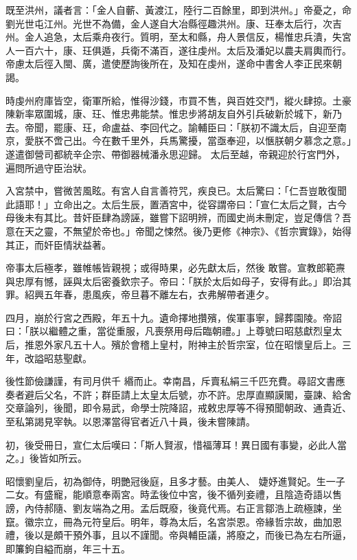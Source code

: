 \begin{pinyinscope}
 既至洪州，議者言：「金人自蘄、黃渡江，陸行二百餘里，即到洪州。」帝憂之，命劉光世屯江州。光世不為備，金人遂自大冶縣徑趣洪州。康、玨奉太后行，次吉州。金人追急，太后乘舟夜行。質明，至太和縣，舟人景信反，楊惟忠兵潰，失宮人一百六十，康、玨俱遁，兵衛不滿百，遂往虔州。太后及潘妃以農夫肩輿而行。
 帝慮太后徑入閩、廣，遣使歷詢後所在，及知在虔州，遂命中書舍人李正民來朝謁。



 時虔州府庫皆空，衛軍所給，惟得沙錢，市買不售，與百姓交鬥，縱火肆掠。土豪陳新率眾圍城，康、玨、惟忠弗能禁。惟忠步將胡友自外引兵破新於城下，新乃去。帝聞，罷康、玨，命盧益、李回代之。諭輔臣曰：「朕初不識太后，自迎至南京，愛朕不啻己出。今在數千里外，兵馬驚擾，當亟奉迎，以愜朕朝夕慕念之意。」遂遣御營司都統辛企宗、帶御器械潘永思迎歸。
 太后至越，帝親迎於行宮門外，遍問所過守臣治狀。



 入宮禁中，嘗微苦風眩。有宮人自言善符咒，疾良已。太后驚曰：「仁吾豈敢復聞此語耶！」立命出之。太后生辰，置酒宮中，從容謂帝曰：「宣仁太后之賢，古今母後未有其比。昔奸臣肆為謗誣，雖嘗下詔明辨，而國史尚未刪定，豈足傳信？吾意在天之靈，不無望於帝也。」帝聞之悚然。後乃更修《神宗》、《哲宗實錄》，始得其正，而奸臣情狀益著。



 帝事太后極孝，雖帷帳皆親視；或得時果，必先獻太后，然後
 敢嘗。宣教郎範燾與忠厚有憾，誣與太后密養欽宗子。帝曰：「朕於太后如母子，安得有此。」即治其罪。紹興五年春，患風疾，帝旦暮不離左右，衣弗解帶者連夕。



 四月，崩於行宮之西殿，年五十九。遺命擇地攢殯，俟軍事寧，歸葬園陵。帝詔曰：「朕以繼體之重，當從重服，凡喪祭用母后臨朝禮。」上尊號曰昭慈獻烈皇太后，推恩外家凡五十人。殯於會稽上皇村，附神主於哲宗室，位在昭懷皇后上。三年，改謚昭慈聖獻。



 後性節儉謙謹，有司月供千
 緡而止。幸南昌，斥賣私絹三千匹充費。尋詔文書應奏者避后父名，不許；群臣請上太皇太后號，亦不許。忠厚直顯謨閣，臺諫、給舍交章論列，後聞，即令易武，命學士院降詔，戒敕忠厚等不得預聞朝政、通貴近、至私第謁見宰執。以恩澤當得官者近八十員，後未嘗陳請。



 初，後受冊日，宣仁太后嘆曰：「斯人賢淑，惜福薄耳！異日國有事變，必此人當之。」後皆如所云。



 昭懷劉皇后，初為御侍，明艷冠後庭，且多才藝。由美人、
 婕妤進賢妃。生一子二女。有盛寵，能順意奉兩宮。時孟後位中宮，後不循列妾禮，且陰造奇語以售謗，內侍郝隨、劉友端為之用。孟后既廢，後竟代焉。右正言鄒浩上疏極諫，坐竄。徽宗立，冊為元符皇后。明年，尊為太后，名宮崇恩。帝緣哲宗故，曲加恩禮，後以是頗干預外事，且以不謹聞。帝與輔臣議，將廢之，而後已為左右所逼，即簾鉤自縊而崩，年三十五。




\end{pinyinscope}
